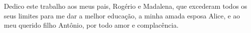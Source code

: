\begin{dedicatoria}
   \vspace*{\fill}
   Dedico este trabalho aos meus pais, Rogério e Madalena, que excederam todos os seus limites para me dar a melhor educação, a minha amada esposa Alice, e ao meu querido filho Antônio, por todo amor e complacência.
\end{dedicatoria}
